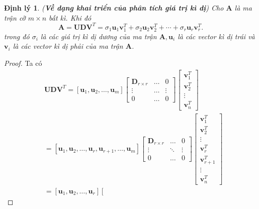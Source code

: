 \documentclass[12pt,a4paper,oneside]{report}
\newtheorem{dl}{Định lý}[section]
\numberwithin{equation}{section}
\begin{document}
\begin{dl} \cite{linh2016} (\textbf{Về dạng khai triển của phân tích giá trị kì dị}) Cho $\mathbf{A}$ là ma trận cỡ $m \times n$ bất kì. Khi đó
\begin{equation} \label{eq_4}
\mathbf{A}=\mathbf{U D V}^{T}=\sigma_{1} \mathbf{u}_{1} \mathbf{v}_{1}^{T}+\sigma_{2} \mathbf{u}_{2} \mathbf{v}_{2}^{T}+\cdots+\sigma_{r} \mathbf{u}_{r} \mathbf{v}_{r}^{T}.
\end{equation}
trong đó $\sigma_{i}$ là các giá trị kì dị dương của ma trận $\mathbf{A}, \mathbf{u}_{i}$ là các vector kì dị trái và $\mathbf{v}_{i}$ là các vector kì dị phải của ma trận $\mathbf{A}$.
\end{dl}
\begin{proof}
Ta có
$$
\begin{aligned}
	& \mathbf{U D V}^{T}=\left[\mathbf{u}_{1}, \mathbf{u}_{2}, \ldots, \mathbf{u}_{m}\right]\left[\begin{array}{ccc}
		\mathbf{D}_{r \times r} & \ldots & 0 \\
		\vdots & \ldots & \vdots \\
		0 & \ldots & 0
	\end{array}\right]\left[\begin{array}{c}
		\mathbf{v}_{1}^{T} \\
		\mathbf{v}_{2}^{T} \\
		\vdots \\
		\mathbf{v}_{n}^{T}
	\end{array}\right]\\
	& =\left[\mathbf{u}_{1}, \mathbf{u}_{2}, \ldots, \mathbf{u}_{r}, \mathbf{u}_{r+1}, \ldots, \mathbf{u}_{m}\right]\left[\begin{array}{ccc}
		\mathbf{D}_{r \times r} & \ldots & 0 \\
		\vdots & \ddots & \vdots \\
		0 & \ldots & 0
	\end{array}\right]\left[\begin{array}{c}
		\mathbf{v}_{1}^{T} \\
		\mathbf{v}_{2}^{T} \\
		\vdots \\
		\mathbf{v}_{r}^{T} \\
		\mathbf{v}_{r+1}^{T} \\
		\vdots \\
		\mathbf{v}_{n}^{T}
	\end{array}\right] \\
	& \left.=\left[\mathbf{u}_{1}, \mathbf{u}_{2}, \ldots, \mathbf{u}_{r}\right]\left[\begin{array}{ccc}

\end{array}
\end{aligned}$$
\end{proof}
\end{document}
